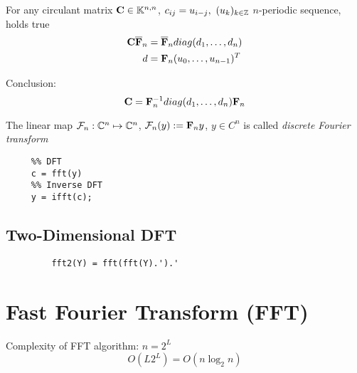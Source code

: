 	\begin{lemma}
	 For any circulant matrix $\mathbf{C} \in \mathbb{K}^{n,n}$, $c_{ij} = u_{i-j},\ (u_k)_{k \in \mathbb{Z}}$ $n$-periodic sequence, holds true
	 \begin{align*}
	  \mathbf{C} \overline{\mathbf{F}}_n &= \overline{\mathbf{F}}_n diag(d_1, \ldots,d_n)\\
	  d &= \mathbf{F}_n (u_0, \ldots, u_{n-1})^T
	 \end{align*}
	\end{lemma}

	Conclusion:
		\[
		 \mathbf{C} = \mathbf{F}_n^{-1} diag(d_1, \ldots, d_n) \mathbf{F}_n
		\]

	\begin{definition}
	 The linear map $\mathcal F_n: \mathbb{C}^n \mapsto \mathbb{C}^n$, $\mathcal F_n(y) := \mathbf{F}_n y$, $y\in C^n$ is called \emph{discrete Fourier transform}
	\end{definition}
	
	\begin{lstlisting}
	 %% DFT
	 c = fft(y)
	 %% Inverse DFT
	 y = ifft(c);
	\end{lstlisting}

	\subsection{Two-Dimensional DFT}
		\begin{lstlisting}
		 fft2(Y) = fft(fft(Y).').'
		\end{lstlisting}
		
\section{Fast Fourier Transform (FFT)}
	Complexity of FFT algorithm: $n=2^L$
	\[
	 O(L2^L) = O(n \log_2 n)
	\]
